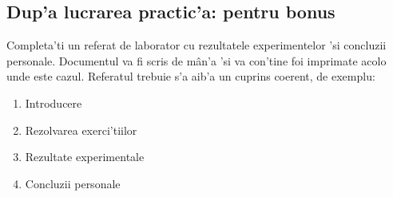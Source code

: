 \subsection*{Dup'a lucrarea practic'a: pentru bonus}
Completa'ti un referat de laborator cu rezultatele experimentelor 'si concluzii personale. Documentul va fi scris de m\^an'a 'si va con'tine foi imprimate acolo unde este cazul. Referatul trebuie s'a aib'a un cuprins coerent, de exemplu:

\begin{enumerate}
\item Introducere
\item Rezolvarea exerci'tiilor 
\item Rezultate experimentale
\item Concluzii personale
\end{enumerate}